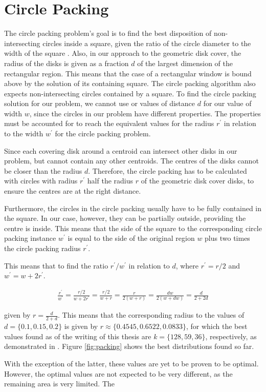 \section{Circle Packing}
\label{ann:packing}
The circle packing problem's goal is to find the best disposition of non-intersecting circles inside a square, given the ratio of the circle diameter to the width of the square \cite{packing}. Also, in our approach to the geometric disk cover, the radius of the disks is given as a fraction $d$ of the largest dimension of the rectangular region. This means that the case of a rectangular window is bound above by the solution of its containing square. The circle packing algorithm also expects non-intersecting circles contained by a square. To find the circle packing solution for our problem, we cannot use or values of distance $d$ for our value of width $w$, since the circles in our problem have different properties. The properties must be accounted for to reach the equivalent values for the radius $r^\prime$ in relation to the width $w^\prime$ for the circle packing problem.

Since each covering disk around a centroid can intersect other disks in our problem, but cannot contain any other centroids. The centres of the disks cannot be closer than the radius $d$. Therefore, the circle packing has to be calculated with circles with radius $r^\prime$ half the radius $r$ of the geometric disk cover disks, to ensure the centres are at the right distance. 

Furthermore, the circles in the circle packing usually have to be fully contained in the square. In our case, however, they can be partially outside, providing the centre is inside. This means that the side of the square to the corresponding circle packing instance $w^\prime$ is equal to the side of the original region $w$ plus two times the circle packing radius $r^\prime$.

This means that to find the ratio $r^\prime/w^\prime$ in relation to $d$, where $r^\prime=r/2$ and $w^\prime=w+2r^\prime$.

\begin{align}
	\frac{r^\prime}{w^\prime} = \frac{r/2}{w+2r^\prime} = \frac{r/2}{w+r} = \frac{r}{2(w+r)} = \frac{dw}{2(w+dw)}=\frac{d}{2+2d}
\end{align}

given by $r=\frac{d}{2+d}$. This means that the corresponding radius to the values of $d=\{0.1,0.15,0.2\}$ is given by $r\approx\{0.4545,0.6522,0.0833\}$, for which the best values found as of the writing of this thesis are $k=\{128,59,36\}$, respectively, as demonstrated in \cite{pack1,pack2,pack3}. Figure \ref{fig:packing} shows the best distributions found so far.




With the exception of the latter, these values are yet to be proven to be optimal. However, the optimal values are not expected to be very different, as the remaining area is very limited. The
